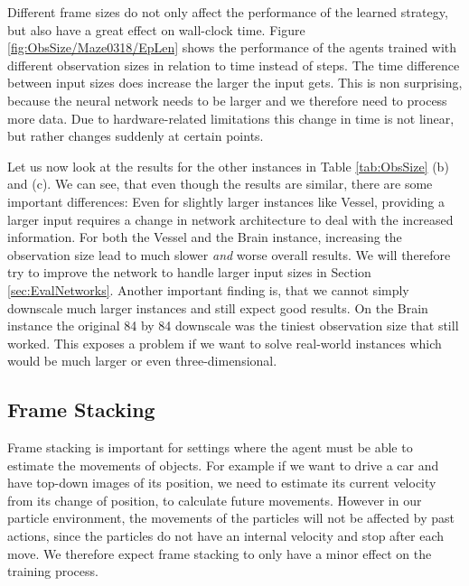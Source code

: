 Different frame sizes do not only affect the performance of the learned strategy, but also have a great effect on wall-clock time. Figure \ref{fig:ObsSize/Maze0318/EpLen} shows the performance of the agents trained with different observation sizes in relation to time instead of steps. The time difference between input sizes does increase the larger the input gets. This is non surprising, because the neural network needs to be larger and we therefore need to process more data. Due to hardware-related limitations this change in time is not linear, but rather changes suddenly at certain points.

Let us now look at the results for the other instances in Table \ref{tab:ObsSize} (b) and (c). We can see, that even though the results are similar, there are some important differences: Even for slightly larger instances like Vessel, providing a larger input requires a change in network architecture to deal with the increased information. For both the Vessel and the Brain instance, increasing the observation size lead to much slower \textit{and} worse overall results. We will therefore try to improve the network to handle larger input sizes in Section \ref{sec:EvalNetworks}. Another important finding is, that we cannot simply downscale much larger instances and still expect good results. On the Brain instance the original 84 by 84 downscale was the tiniest observation size that still worked. This exposes a problem if we want to solve real-world instances which would be much larger or even three-dimensional. 


\subsection{Frame Stacking} \label{sec:Eval/FrameStack}
Frame stacking is important for settings where the agent must be able to estimate the movements of objects. For example if we want to drive a car and have top-down images of its position, we need to estimate its current velocity from its change of position, to calculate future movements. However in our particle environment, the movements of the particles will not be affected by past actions, since the particles do not have an internal velocity and stop after each move. We therefore expect frame stacking to only have a minor effect on the training process.   

